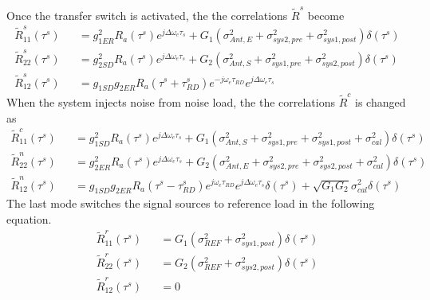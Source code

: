 \documentclass[draftcls]{IEEEtran}
\begin{document}
Once the transfer switch is activated, the the correlations $\tilde{R}^s$ become
\begin{eqnarray}
\tilde{R}_{11}^s(\tau^s) &&= g^2_{1ER} R_a(\tau^s)e^{j\Delta\omega_e\tau_s}+
G_1(\sigma^2_{Ant,E}+\sigma^2_{sys2,pre} +\sigma^2_{sys1,post}) \delta(\tau^s)                                       
\label{Eq: R22_reduce_swap} \\
\tilde{R}_{22}^s(\tau^s) &&= g^2_{2SD} R_a(\tau^s)e^{j\Delta\omega_e\tau_s}+
G_2(\sigma^2_{Ant,S}+\sigma^2_{sys1,pre} +\sigma^2_{sys2,post}) \delta(\tau^s)                                      
\label{Eq: R11_reduce_swap} \\
	\tilde{R}_{12}^s(\tau^s) &&= g_{1SD} g_{2ER} R_a(\tau^s+\tau^s_{RD})e^{-j\omega_e \tau_{RD}} e^{j\Delta\omega_e\tau_s}  
\label{Eq: R12_reduce_swap}
\end{eqnarray}
When the system injects noise from noise load, the the correlations $\tilde{R}^c$ is changed as
\begin{eqnarray}
	\tilde{R}_{11}^c(\tau^s) &&= g^2_{1SD} R_a(\tau^s)e^{j\Delta\omega_e\tau_s}+
G_1(\sigma^2_{Ant,S}+\sigma^2_{sys1,pre} +\sigma^2_{sys1,post}+\sigma^2_{cal}) \delta(\tau^s)                                      
\label{Eq: R11_reduce_cal} \\
	\tilde{R}_{22}^n(\tau^s) &&= g^2_{2ER} R_a(\tau^s)e^{j\Delta\omega_e\tau_s}+
G_2(\sigma^2_{Ant,E}+\sigma^2_{sys2,pre} +\sigma^2_{sys2,post}+\sigma^2_{cal}) \delta(\tau^s)                                       
\label{Eq: R22_reduce_cal} \\
	\tilde{R}_{12}^n(\tau^s) &&= g_{1SD} g_{2ER} R_a(\tau^s-\tau^s_{RD})e^{j\omega_e \tau_{RD}} e^{j\Delta\omega_e\tau_s}\delta(\tau^s)+
    \sqrt{G_1 G_2}\sigma^2_{cal}\delta(\tau^s)  
\label{Eq: R12_reduce_cal}
\end{eqnarray}The last mode switches the signal sources to reference load in the following equation.
\begin{eqnarray}
	\tilde{R}_{11}^r(\tau^s) &&= G_1(\sigma^2_{REF}+\sigma^2_{sys1,post}) \delta(\tau^s)                                      
\label{Eq: R11_reduce_ref} \\
	\tilde{R}_{22}^r(\tau^s) &&= G_2(\sigma^2_{REF}+\sigma^2_{sys2,post}) \delta(\tau^s)                                
\label{Eq: R22_reduce_ref} \\
	\tilde{R}_{12}^r(\tau^s) &&= 0 
\label{Eq: R12_reduce_ref}
\end{eqnarray}
\end{document}
